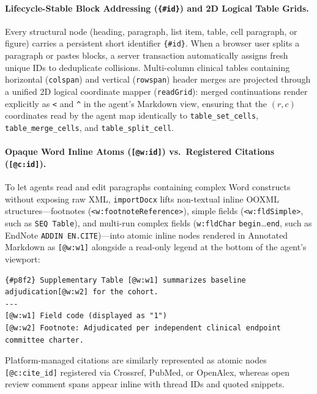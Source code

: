 \documentclass[11pt,a4paper]{article}
\begin{document}
\paragraph{Lifecycle-Stable Block Addressing (\texttt{\{\#id\}}) and 2D Logical Table Grids.}
Every structural node (heading, paragraph, list item, table, cell paragraph, or figure) carries a persistent short identifier \texttt{\{\#id\}}. When a browser user splits a paragraph or pastes blocks, a server transaction automatically assigns fresh unique IDs to deduplicate collisions. Multi-column clinical tables containing horizontal (\texttt{colspan}) and vertical (\texttt{rowspan}) header merges are projected through a unified 2D logical coordinate mapper (\texttt{readGrid}): merged continuations render explicitly as \texttt{<} and \texttt{\textasciicircum} in the agent's Markdown view, ensuring that the $(r, c)$ coordinates read by the agent map identically to \texttt{table\_set\_cells}, \texttt{table\_merge\_cells}, and \texttt{table\_split\_cell}.

\paragraph{Opaque Word Inline Atoms (\texttt{[@w:id]}) vs.\ Registered Citations (\texttt{[@c:id]}).}
To let agents read and edit paragraphs containing complex Word constructs without exposing raw XML, \texttt{importDocx} lifts non-textual inline OOXML structures---footnotes (\texttt{<w:footnote\allowbreak Reference>}), simple fields (\texttt{<w:fldSimple>}, such as \texttt{SEQ Table}), and multi-run complex fields (\texttt{w:fldChar} \texttt{begin}\dots\texttt{end}, such as EndNote \texttt{ADDIN EN.CITE})---into atomic inline nodes rendered in Annotated Markdown as \texttt{[@w:w1]} alongside a read-only legend at the bottom of the agent's viewport:
\begin{lstlisting}[style=heurionspec]
{#p8f2} Supplementary Table [@w:w1] summarizes baseline adjudication[@w:w2] for the cohort.
---
[@w:w1] Field code (displayed as "1")
[@w:w2] Footnote: Adjudicated per independent clinical endpoint committee charter.
\end{lstlisting}
Platform-managed citations are similarly represented as atomic nodes \texttt{[@c:cite\_id]} registered via Crossref, PubMed, or OpenAlex, whereas open review comment spans appear inline with thread IDs and quoted snippets.

\end{document}
